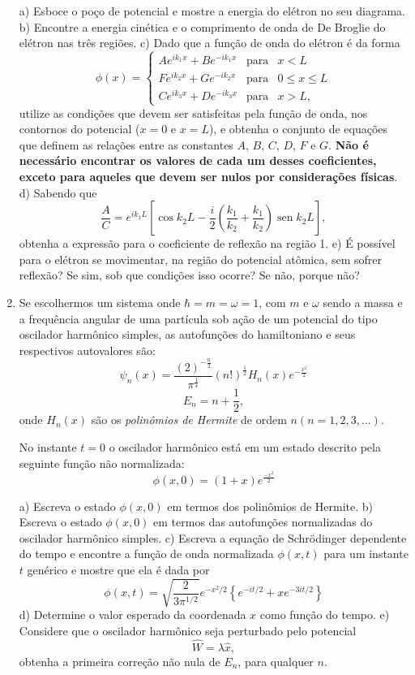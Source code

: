\begin{enumerate}[start=1,label={\bfseries Q\arabic*.}]
  a) Esboce o poço de potencial e mostre a energia do elétron no seu diagrama.
  b) Encontre a energia cinética e o comprimento de onda de De Broglie do elétron nas três regiões.
  c) Dado que a função de onda do elétron é da forma
  $$
    \phi(x)=\left\{\begin{array}{cccc}
    A e^{ik_{1}x} + B e^{-ik_{1} x } & \mbox{para} & x < L \\
    F e^{ik_{2}x} + G e^{-ik_{2} x } & \mbox{para} & 0 \leq x \leq  L \\
    C e^{ik_{3}x} + D e^{-ik_{3} x } & \mbox{para} & x > L ,
    \end{array}\right.
  $$
  utilize as condições que devem ser satisfeitas pela função de onda, nos contornos do potencial ($x=0$ e $x=L$), e obtenha o conjunto de equações que definem as relações entre as constantes $A$, $B$, $C$, $D$, $F$ e $G$. \textbf{Não é necessário encontrar os valores de cada um desses coeficientes, exceto para aqueles que devem ser nulos por considerações físicas}.
  d) Sabendo que
  $$
  \frac{A}{C} = e^{ik_{1}L} \left[ \operatorname{cos}k_{2}L - \frac{i}{2} \left( \frac{k_{1}}{k_{2}} + \frac{k_{1}}{k_{2}} \right) \operatorname{sen} k_{2} L   \right],
  $$
  obtenha a expressão para o coeficiente de reflexão na região 1.
  e) É possível para o elétron se movimentar, na região do potencial atômica, sem sofrer reflexão? Se sim, sob que condições isso ocorre? Se não, porque não?


\item Se escolhermos um sistema onde $\hbar = m = \omega = 1$, com $m$ e $\omega$ sendo a massa e a frequência angular de uma partícula sob ação de um potencial do tipo oscilador harmônico simples, as autofunções do hamiltoniano e seus respectivos autovalores são:
$$
\psi_{n} (x) = \frac{(2)^{- \frac{n}{2}}}{\pi^{\frac{1}{4}}} (n!)^{\frac{1}{2}} H_{n} (x) e^{- \frac{x^{2}}{2}}
$$
$$
E_{n} = n + \frac{1}{2},
$$
onde $H_{n}(x)$ são os \textit{polinômios de Hermite} de ordem $n (n=1,2,3, ...)$.

No instante $t=0$ o oscilador harmônico está em um estado descrito pela seguinte função não normalizada:
$$
\phi(x,0) = (1+x)e^{\frac{-x^{2}}{2}}
$$

  a) Escreva o estado $\phi(x,0)$ em termos dos polinômios de Hermite.
  b) Escreva o estado $\phi(x,0)$ em termos das autofunções normalizadas do oscilador harmônico simples.
  c) Escreva a equação de Schrödinger dependente do tempo e encontre a função de onda normalizada $\phi(x,t)$ para um instante $t$ genérico e mostre que ela é dada por
  $$
  \phi(x,t) = \sqrt{\frac{2}{3 \pi^{1/2}}} e^{-x^{2}/2} \left\{  e^{-it/2} + x e^{-3it/2}   \right\}
  $$
  d) Determine o valor esperado da coordenada $x$ como função do tempo.
  e) Considere que o oscilador harmônico seja perturbado pelo potencial
  $$
  \hat{W} = \lambda \hat{x},
  $$
  obtenha a primeira correção não nula de $E_{n}$, para qualquer $n$.





\end{enumerate}
